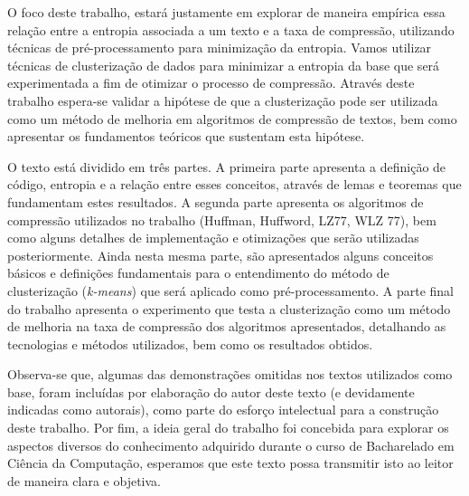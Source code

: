 O foco deste trabalho, estará justamente em explorar de maneira empírica essa relação entre a entropia associada a um texto e a taxa de compressão, utilizando técnicas de pré-processamento para minimização da entropia. 
Vamos utilizar técnicas de clusterização de dados para minimizar a entropia da base que será experimentada a fim de otimizar o processo de compressão.
Através deste trabalho espera-se validar a hipótese de que a clusterização pode ser utilizada como um método de melhoria em algoritmos de compressão de textos, bem como apresentar os fundamentos teóricos que sustentam esta hipótese.

O texto está dividido em três partes.
 A primeira parte apresenta a definição de código, entropia e a relação entre esses conceitos, através de lemas e teoremas que fundamentam estes resultados.
 A segunda parte apresenta os algoritmos de compressão utilizados no trabalho (Huffman, Huffword, LZ77, WLZ 77), bem como alguns detalhes de implementação e otimizações que serão utilizadas posteriormente.
 Ainda nesta mesma parte, são apresentados alguns conceitos básicos e definições fundamentais para o entendimento do método de clusterização (\emph{k-means}) que será aplicado como pré-processamento.
 A parte final do trabalho apresenta o experimento que testa a clusterização como um método de melhoria na taxa de compressão dos algoritmos apresentados, detalhando as tecnologias e métodos utilizados, bem como os resultados obtidos.
 
 Observa-se que, algumas das demonstrações omitidas nos textos utilizados como base, foram incluídas por elaboração do autor deste texto (e devidamente indicadas como autorais), como parte do esforço intelectual para a construção deste trabalho.
 Por fim, a ideia geral do trabalho foi concebida para explorar os aspectos diversos do conhecimento adquirido durante o curso de Bacharelado em Ciência da Computação, esperamos que este texto possa transmitir isto ao leitor de maneira clara e objetiva.
